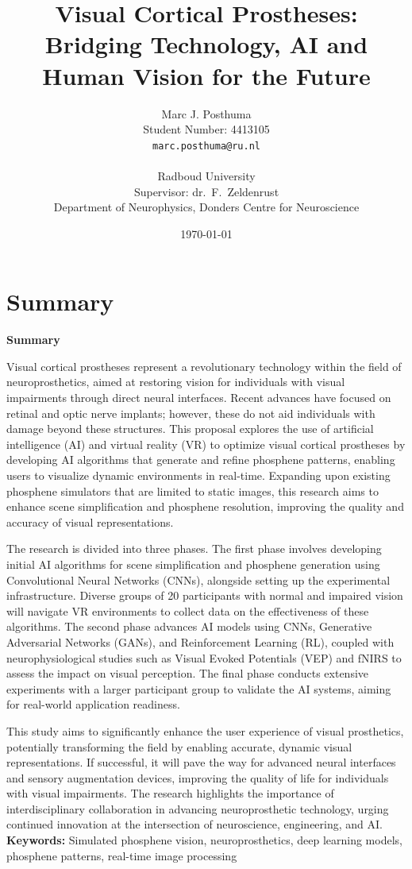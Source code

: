 \documentclass[10pt]{article}
\title{Visual Cortical Prostheses: Bridging Technology, AI and Human Vision for the Future}
\author{
  Marc J. Posthuma\\
  Student Number: 4413105\\
  \texttt{marc.posthuma@ru.nl}\\
  \\
  Radboud University\\
  Supervisor: dr.\ F.\ Zeldenrust\\
  Department of Neurophysics, Donders Centre for Neuroscience
}
\date{\today}
\makeatletter
\renewenvironment{abstract}{%
    \if@twocolumn%
      \section*{\abstractname}%
    \else
      \begin{center}%
        {\bfseries \large\abstractname\vspace{-.5em}\vspace{\z@}}%
      \end{center}%
      \quotation\small %
    \fi}
    {\if@twocolumn\else\endquotation\fi}%
\renewcommand{\abstractname}{Summary}
\makeatother
\begin{document}
\pagestyle{plain}%
\listoftodos%
\clearpage%

\newpage%

\maketitle
\thispagestyle{firstpage} %
\begin{abstract}
  \noindent Visual cortical prostheses represent a revolutionary technology
  within the field of neuroprosthetics, aimed at restoring vision for
  individuals with visual impairments through direct neural interfaces. Recent
  advances have focused on retinal and optic nerve implants; however, these do
  not aid individuals with damage beyond these structures. This proposal
  explores the use of artificial intelligence (AI) and virtual reality (VR) to
  optimize visual cortical prostheses by developing AI algorithms that generate
  and refine phosphene patterns, enabling users to visualize dynamic
  environments in real-time. Expanding upon existing phosphene simulators that
  are limited to static images, this research aims to enhance scene
  simplification and phosphene resolution, improving the quality and accuracy of
  visual representations.

  The research is divided into three phases. The first phase involves developing
  initial AI algorithms for scene simplification and phosphene generation using
  Convolutional Neural Networks (CNNs), alongside setting up the experimental
  infrastructure. Diverse groups of 20 participants with normal and impaired
  vision will navigate VR environments to collect data on the effectiveness of
  these algorithms. The second phase advances AI models using CNNs, Generative
  Adversarial Networks (GANs), and Reinforcement Learning (RL), coupled with
  neurophysiological studies such as Visual Evoked Potentials (VEP) and fNIRS to
  assess the impact on visual perception. The final phase conducts extensive
  experiments with a larger participant group to validate the AI systems, aiming
  for real-world application readiness.

  This study aims to significantly enhance the user experience of visual
  prosthetics, potentially transforming the field by enabling accurate, dynamic
  visual representations. If successful, it will pave the way for advanced
  neural interfaces and sensory augmentation devices, improving the quality of
  life for individuals with visual impairments. The research highlights the
  importance of interdisciplinary collaboration in advancing neuroprosthetic
  technology, urging continued innovation at the intersection of neuroscience,
  engineering, and AI.\@
\end{abstract}
\textbf{Keywords:} Simulated  phosphene vision, neuroprosthetics, deep learning models, phosphene patterns, real-time image processing
\end{document}
